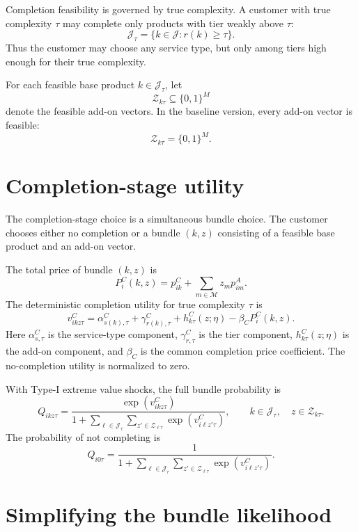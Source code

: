 \documentclass[11pt]{article}
\newcommand{\J}{\mathcal{J}}
\newcommand{\Zset}{\mathcal{Z}}
\newcommand{\Mset}{\mathcal{M}}
\begin{document}
Completion feasibility is governed by true complexity. A customer with true complexity $\tau$ may complete only products with tier weakly above $\tau$:
\[
\J_\tau=\{k\in\J:r(k)\geq \tau\}.
\]
Thus the customer may choose any service type, but only among tiers high enough for their true complexity.

For each feasible base product $k\in\J_\tau$, let
\[
\Zset_{k\tau}\subseteq\{0,1\}^M
\]
denote the feasible add-on vectors. In the baseline version, every add-on vector is feasible:
\[
\Zset_{k\tau}=\{0,1\}^M.
\]

\section{Completion-stage utility}

The completion-stage choice is a simultaneous bundle choice. The customer chooses either no completion or a bundle $(k,z)$ consisting of a feasible base product and an add-on vector.

The total price of bundle $(k,z)$ is
\[
P_i^C(k,z)=p_{ik}^C+\sum_{m\in\Mset}z_m p_{im}^A.
\]
The deterministic completion utility for true complexity $\tau$ is
\[
v^C_{ikz\tau}
=
\alpha^C_{s(k),\tau}
+
\gamma^C_{r(k),\tau}
+
h^C_{k\tau}(z;\eta)
-
\beta_C P_i^C(k,z).
\]
Here $\alpha^C_{s,\tau}$ is the service-type component, $\gamma^C_{r,\tau}$ is the tier component, $h^C_{k\tau}(z;\eta)$ is the add-on component, and $\beta_C$ is the common completion price coefficient. The no-completion utility is normalized to zero.

With Type-I extreme value shocks, the full bundle probability is
\[
Q_{ikz\tau}
=
\frac{\exp(v^C_{ikz\tau})}
{1+\sum_{\ell\in\J_\tau}\sum_{z'\in\Zset_{\ell\tau}}\exp(v^C_{i\ell z'\tau})},
\qquad
k\in\J_\tau,
\quad z\in\Zset_{k\tau}.
\]
The probability of not completing is
\[
Q_{i0\tau}
=
\frac{1}
{1+\sum_{\ell\in\J_\tau}\sum_{z'\in\Zset_{\ell\tau}}\exp(v^C_{i\ell z'\tau})}.
\]

\section{Simplifying the bundle likelihood}
\end{document}

